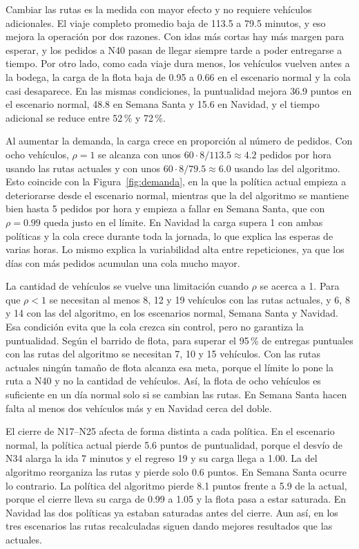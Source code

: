 \documentclass[11pt,letterpaper]{article}
\begin{document}
Cambiar las rutas es la medida con mayor efecto y no requiere vehículos adicionales. El viaje completo promedio baja de 113.5 a 79.5 minutos, y eso mejora la operación por dos razones. Con idas más cortas hay más margen para esperar, y los pedidos a N40 pasan de llegar siempre tarde a poder entregarse a tiempo. Por otro lado, como cada viaje dura menos, los vehículos vuelven antes a la bodega, la carga de la flota baja de 0.95 a 0.66 en el escenario normal y la cola casi desaparece. En las mismas condiciones, la puntualidad mejora 36.9 puntos en el escenario normal, 48.8 en Semana Santa y 15.6 en Navidad, y el tiempo adicional se reduce entre 52\,\% y 72\,\%.

Al aumentar la demanda, la carga crece en proporción al número de pedidos. Con ocho vehículos, $\rho=1$ se alcanza con unos $60\cdot 8/113.5\approx 4.2$ pedidos por hora usando las rutas actuales y con unos $60\cdot 8/79.5\approx 6.0$ usando las del algoritmo. Esto coincide con la Figura~\ref{fig:demanda}, en la que la política actual empieza a deteriorarse desde el escenario normal, mientras que la del algoritmo se mantiene bien hasta 5 pedidos por hora y empieza a fallar en Semana Santa, que con $\rho=0.99$ queda justo en el límite. En Navidad la carga supera 1 con ambas políticas y la cola crece durante toda la jornada, lo que explica las esperas de varias horas. Lo mismo explica la variabilidad alta entre repeticiones, ya que los días con más pedidos acumulan una cola mucho mayor.

La cantidad de vehículos se vuelve una limitación cuando $\rho$ se acerca a 1. Para que $\rho<1$ se necesitan al menos 8, 12 y 19 vehículos con las rutas actuales, y 6, 8 y 14 con las del algoritmo, en los escenarios normal, Semana Santa y Navidad. Esa condición evita que la cola crezca sin control, pero no garantiza la puntualidad. Según el barrido de flota, para superar el 95\,\% de entregas puntuales con las rutas del algoritmo se necesitan 7, 10 y 15 vehículos. Con las rutas actuales ningún tamaño de flota alcanza esa meta, porque el límite lo pone la ruta a N40 y no la cantidad de vehículos. Así, la flota de ocho vehículos es suficiente en un día normal solo si se cambian las rutas. En Semana Santa hacen falta al menos dos vehículos más y en Navidad cerca del doble.

El cierre de N17--N25 afecta de forma distinta a cada política. En el escenario normal, la política actual pierde 5.6 puntos de puntualidad, porque el desvío de N34 alarga la ida 7 minutos y el regreso 19 y su carga llega a 1.00. La del algoritmo reorganiza las rutas y pierde solo 0.6 puntos. En Semana Santa ocurre lo contrario. La política del algoritmo pierde 8.1 puntos frente a 5.9 de la actual, porque el cierre lleva su carga de 0.99 a 1.05 y la flota pasa a estar saturada. En Navidad las dos políticas ya estaban saturadas antes del cierre. Aun así, en los tres escenarios las rutas recalculadas siguen dando mejores resultados que las actuales.
\end{document}
